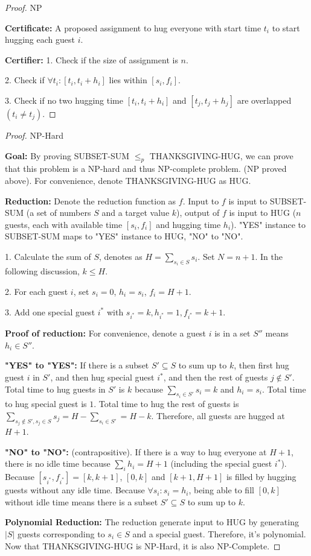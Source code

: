 \documentclass[openany]{article}
\begin{document}
\begin{proof}{NP}

\textbf{Certificate:} A proposed assignment to hug everyone with start time $t_i$ to start hugging each guest $i$.

\textbf{Certifier:} 1. Check if the size of assignment is $n$.

2. Check if $\forall t_i: [t_i, t_i+h_i]$ lies within $[s_i, f_i]$.

3. Check if no two hugging time $[t_i, t_i+h_i]$ and $[t_j, t_j+h_j]$ are overlapped $(t_i \neq t_j)$.

\end{proof}

\begin{proof}{NP-Hard}

\textbf{Goal:} By proving SUBSET-SUM $\leqslant_p$ THANKSGIVING-HUG, we can prove that this problem is a NP-hard and thus NP-complete problem. (NP proved above). For convenience, denote THANKSGIVING-HUG as HUG.

\textbf{Reduction:} Denote the reduction function as $f$. Input to $f$ is input to SUBSET-SUM (a set of numbers $S$ and a target value $k$), output of $f$ is input to HUG ($n$ guests, each with available time $[s_i, f_i]$ and hugging time $h_i$). "YES" instance to SUBSET-SUM maps to "YES" instance to HUG, "NO" to "NO". 

1. Calculate the sum of $S$, denotes as $H = \sum_{s_i\in S}s_i$. Set $N = n+1$. In the following discussion, $k \leqslant H$.

2. For each guest $i$, set $s_i = 0$, $h_i=s_i$, $f_i = H+1$. 

3. Add one special guest $i^*$ with $s_{i^*} = k, h_{i^*} = 1, f_{i^*} = k+1$.


\textbf{Proof of reduction:} For convenience, denote a guest $i$ is in a set $S''$ means $h_i\in S''$.

\textbf{"YES" to "YES":} If there is a subset $S' \subseteq S$ to sum up to $k$, then first hug guest $i$ in $S'$, and then hug special guest $i^*$, and then the rest of guests $j  \not\in S'$. Total time to hug guests in $S'$ is $k$ because $\sum_{s_i\in S'}s_i = k $ and $h_i = s_i$. Total time to hug special guest is $1$. Total time to hug the rest of guests is $\sum_{s_j\notin S', s_j\in S} s_j = H-\sum_{s_i\in S'} = H-k$. Therefore, all guests are hugged at $H+1$.


\textbf{"NO" to "NO":} (contrapositive). If there is a way to hug everyone at $H+1$, there is no idle time because $\sum_i h_i = H+1$ (including the special guest $i^*$). Because $[s_{i^*},f_{i^*}] = [k, k+1]$, $[0,k]$ and $[k+1, H+1]$ is filled by hugging guests without any idle time. Because $\forall s_i: s_i=h_i$, being able to fill $[0,k]$ without idle time means there is a subset $S' \subseteq S$ to sum up to $k$.

\textbf{Polynomial Reduction:} The reduction generate input to HUG by generating $|S|$ guests corresponding to $s_i\in S$ and a special guest. Therefore, it's polynomial. Now that THANKSGIVING-HUG is NP-Hard, it is also NP-Complete.
\end{proof}
\end{document}
